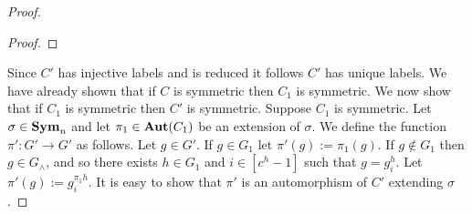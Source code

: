 \documentclass[../paper.tex]{subfiles}
\begin{document}
\begin{proof}
\begin{proof}
  \end{proof}
  
  Since $C'$ has injective labels and is reduced it follows $C'$ has unique
  labels. We have already shown that if $C$ is symmetric then $C_1$ is
  symmetric. We now show that if $C_1$ is symmetric then $C'$ is symmetric.
  Suppose $C_1$ is symmetric. Let $\sigma \in \text{\textbf{Sym}}_n$ and let $\pi_1 \in
  \text{\textbf{Aut}}(C_1)$ be an extension of $\sigma$. We define the function $\pi' : G'
  \rightarrow G'$ as follows. Let $g \in G'$. If $g \in G_1$ let $\pi'(g) :=
  \pi_1(g)$. If $g \not\in G_1$ then $g \in G_\land$, and so there exists $h \in
  G_1$ and $i \in [c^h - 1]$ such that $g = g^h_i$. Let $\pi'(g) := g^{\pi_1
    h}_i$. It is easy to show that $\pi'$ is an automorphism of $C'$ extending
  $\sigma$.


\end{proof}
\end{document}
